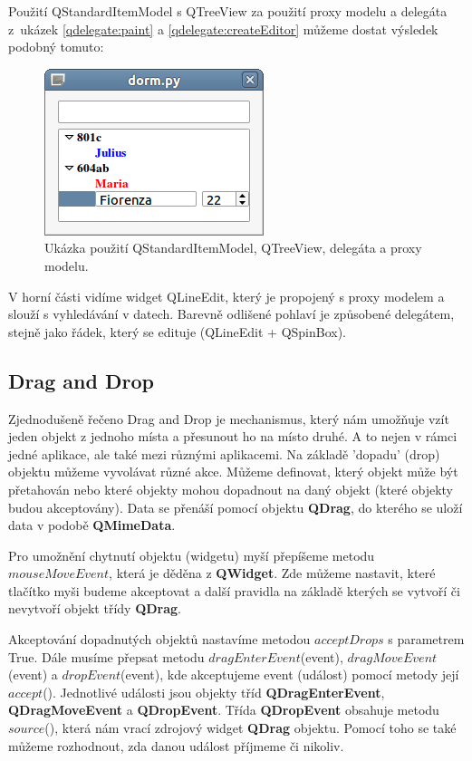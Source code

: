 Použití QStandardItemModel s QTreeView za použití proxy modelu a
delegáta z~ukázek \ref{qdelegate:paint} a \ref{qdelegate:createEditor}
můžeme dostat výsledek podobný tomuto:

\begin{figure}[h]
	\centering
	\includegraphics[scale=0.7]{pictures/qt/dorm}
	\caption{Ukázka použití QStandardItemModel, QTreeView, delegáta a proxy modelu.}
	\label{pic:delegate}
\end{figure} 

\noindent

V horní části vidíme widget QLineEdit, který je propojený s proxy
modelem a slouží s vyhledávání v datech. Barevně odlišené pohlaví je
způsobené delegátem, stejně jako řádek, který se edituje (QLineEdit +
QSpinBox). %

\subsection{Drag and Drop}
Zjednodušeně řečeno Drag and Drop je mechanismus, který nám umožňuje
vzít jeden objekt z jednoho místa a přesunout ho na místo druhé. A to
nejen v rámci jedné aplikace, ale také mezi různými aplikacemi. Na
základě 'dopadu' (drop) objektu můžeme vyvolávat různé akce. Můžeme
definovat, který objekt může být přetahován nebo které objekty mohou
dopadnout na daný objekt (které objekty budou akceptovány). Data se
přenáší pomocí objektu \textbf{QDrag}, do kterého se uloží data v
podobě \textbf{QMimeData}.

Pro umožnění chytnutí objektu (widgetu) myší přepíšeme metodu
$mouseMoveEvent$, která je děděna z \textbf{QWidget}. Zde můžeme
nastavit, které tlačítko myši budeme akceptovat a další pravidla na
základě kterých se vytvoří či nevytvoří objekt třídy \textbf{QDrag}.

Akceptování dopadnutých objektů nastavíme metodou $acceptDrops$ s
parametrem True. Dále musíme přepsat metodu $dragEnterEvent$(event),
$dragMoveEvent$(event) a $dropEvent$(event), kde akceptujeme event
(událost) pomocí metody její $accept$(). Jednotlivé události jsou
objekty tříd \textbf{QDragEnterEvent}, \textbf{QDragMoveEvent}
a \textbf{QDropEvent}. Třída \textbf{QDropEvent} obsahuje metodu
$source$(), která nám vrací zdrojový widget \textbf{QDrag}
objektu. Pomocí toho se také můžeme rozhodnout, zda danou událost
příjmeme či nikoliv.

